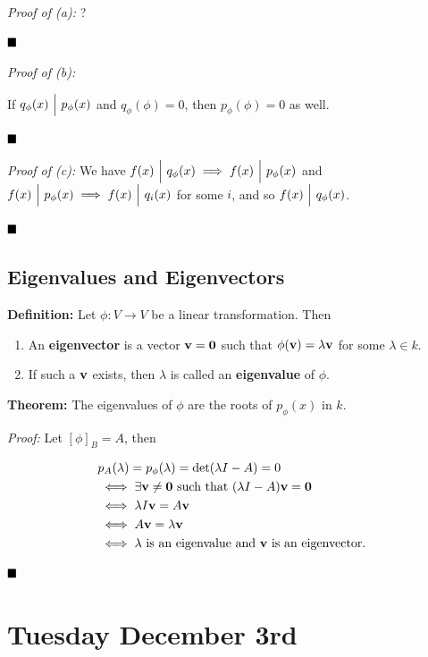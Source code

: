 \emph{Proof of (a):} ?

\(\qed\)

\emph{Proof of (b):}

If \(q_\phi(x) {~\Bigm| ~} p_\phi(x)\) and \(q_\phi(\phi) = 0\), then
\(p_\phi(\phi) = 0\) as well.

\(\qed\)

\emph{Proof of (c):} We have
\(f(x) {~\Bigm| ~} q_\phi(x) \implies f(x) {~\Bigm| ~} p_\phi(x)\) and
\(f(x) {~\Bigm| ~} p_\phi(x) \implies f(x) {~\Bigm| ~} q_i(x)\) for some
\(i\), and so \(f(x) {~\Bigm| ~} q_\phi(x)\).

\(\qed\)

\hypertarget{eigenvalues-and-eigenvectors}{%
\subsection{Eigenvalues and
Eigenvectors}\label{eigenvalues-and-eigenvectors}}

\textbf{Definition:} Let \(\phi: V\to V\) be a linear transformation.
Then

\begin{enumerate}
\def\labelenumi{\arabic{enumi}.}
\item
  An \textbf{eigenvector} is a vector \(\mathbf{v} = \mathbf{0}\) such
  that \(\phi(\mathbf{v}) = \lambda \mathbf{v}\) for some
  \(\lambda \in k\).
\item
  If such a \(\mathbf{v}\) exists, then \(\lambda\) is called an
  \textbf{eigenvalue} of \(\phi\).
\end{enumerate}

\textbf{Theorem:} The eigenvalues of \(\phi\) are the roots of
\(p_\phi(x)\) in \(k\).

\emph{Proof:} Let \([\phi]_B = A\), then

\begin{align*}
&p_A(\lambda) = p_\phi(\lambda) = \det(\lambda I - A) = 0 \\
&\iff \exists \mathbf{v}\neq \mathbf{0} \text{ such that } (\lambda I - A)\mathbf{v} = \mathbf{0} \\
&\iff \lambda I\mathbf{v} = A \mathbf{v} \\
&\iff A\mathbf{v} = \lambda \mathbf{v} \\
&\iff \lambda \text{ is an eigenvalue and } \mathbf{v} \text{ is an eigenvector}
.\end{align*}

\(\qed\)

\hypertarget{tuesday-december-3rd}{%
\section{Tuesday December 3rd}\label{tuesday-december-3rd}}

